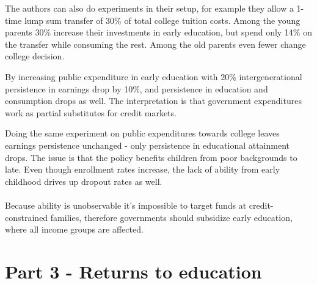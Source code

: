 \documentclass[12pt, a4paper]{article}
\begin{document}
\begin{multicols}{2}
The authors can also do experiments in their setup, for example they allow a 1-time lump sum transfer of 30\% of total college tuition costs. Among the young parents 30\% increase their investments in early education, but spend only 14\% on the transfer while consuming the rest. Among the old parents even fewer change college decision.

By increasing public expenditure in early education with 20\% intergenerational persistence in earnings drop by 10\%, and persistence in education and consumption drops as well. The interpretation is that government expenditures work as partial substitutes for credit markets.

Doing the same experiment on public expenditures towards college leaves earnings persistence unchanged - only persistence in educational attainment drops. The issue is that the policy benefits children from poor backgrounds to late. Even though enrollment rates increase, the lack of ability from early childhood drives up dropout rates as well. 
\\ \\
Because ability is unobservable it's impossible to target funds at credit-constrained families, therefore governments should subsidize early education, where all income groups are affected. 

\section{Part 3 - Returns to education}

\end{multicols}
\end{document}
